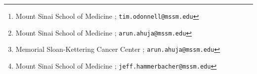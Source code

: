 \author{Timothy O'Donnell%
  \thanks{Mount Sinai School of Medicine ; \texttt{tim.odonnell@mssm.edu}}}

\author{Arun Ahuja%
  \thanks{Mount Sinai School of Medicine ; \texttt{arun.ahuja@mssm.edu}}}

\author{Alexandra Snyder%
  \thanks{Memorial Sloan-Kettering Cancer Center ; \texttt{arun.ahuja@mssm.edu}}}

\author{Jeff Hammerbacher%
  \thanks{Mount Sinai School of Medicine ; \texttt{jeff.hammerbacher@mssm.edu}}}
